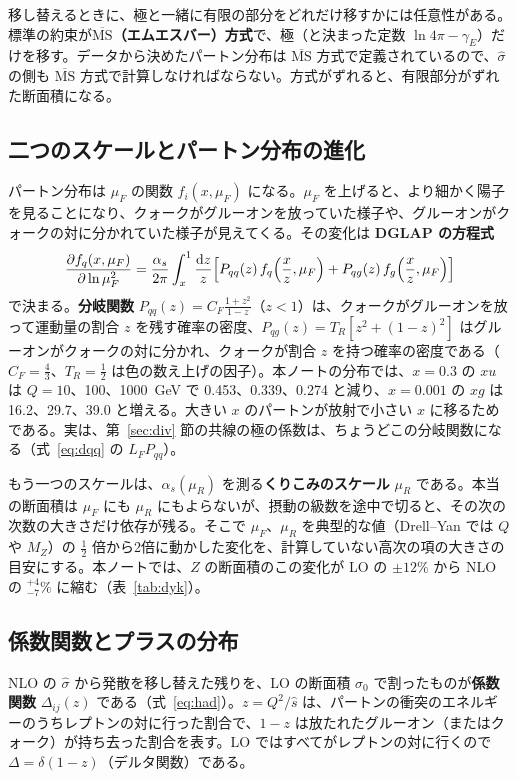 \documentclass[a4paper,10pt]{ltjsarticle}
\newcommand{\dd}{\mathrm{d}}
\newcommand{\MSbar}{\overline{\mathrm{MS}}}
\begin{document}
移し替えるときに、極と一緒に有限の部分をどれだけ移すかには任意性がある。標準の約束が\textbf{$\MSbar$（エムエスバー）方式}で、極（と決まった定数 $\ln4\pi-\gamma_E$）だけを移す。データから決めたパートン分布は $\MSbar$ 方式で定義されているので、$\hat\sigma$ の側も $\MSbar$ 方式で計算しなければならない。方式がずれると、有限部分がずれた断面積になる。

\subsection{二つのスケールとパートン分布の進化}\label{sec:scales}

パートン分布は $\mu_F$ の関数 $f_i(x,\mu_F)$ になる。$\mu_F$ を上げると、より細かく陽子を見ることになり、クォークがグルーオンを放っていた様子や、グルーオンがクォークの対に分かれていた様子が見えてくる。その変化は \textbf{DGLAP の方程式}
\[
\frac{\partial f_q(x,\mu_F)}{\partial\ln\mu_F^2}=\frac{\alpha_s}{2\pi}\int_x^1\frac{\dd z}z\Bigl[P_{qq}(z)\,f_q\Bigl(\frac xz,\mu_F\Bigr)+P_{qg}(z)\,f_g\Bigl(\frac xz,\mu_F\Bigr)\Bigr]
\]
で決まる。\textbf{分岐関数} $P_{qq}(z)=C_F\frac{1+z^2}{1-z}$（$z<1$）は、クォークがグルーオンを放って運動量の割合 $z$ を残す確率の密度、$P_{qg}(z)=T_R[z^2+(1-z)^2]$ はグルーオンがクォークの対に分かれ、クォークが割合 $z$ を持つ確率の密度である（$C_F=\frac43$、$T_R=\frac12$ は色の数え上げの因子）。本ノートの分布では、$x=0.3$ の $xu$ は $Q=10$、100、1000~GeV で 0.453、0.339、0.274 と減り、$x=0.001$ の $xg$ は 16.2、29.7、39.0 と増える。大きい $x$ のパートンが放射で小さい $x$ に移るためである。実は、第~\ref{sec:div} 節の共線の極の係数は、ちょうどこの分岐関数になる（式~\eqref{eq:dqq} の $L_FP_{qq}$）。

もう一つのスケールは、$\alpha_s(\mu_R)$ を測る\textbf{くりこみのスケール} $\mu_R$ である。本当の断面積は $\mu_F$ にも $\mu_R$ にもよらないが、摂動の級数を途中で切ると、その次の次数の大きさだけ依存が残る。そこで $\mu_F$、$\mu_R$ を典型的な値（Drell--Yan では $Q$ や $M_Z$）の $\frac12$ 倍から2倍に動かした変化を、計算していない高次の項の大きさの目安にする。本ノートでは、$Z$ の断面積のこの変化が LO の $\pm12\%$ から NLO の $^{+4}_{-7}\%$ に縮む（表~\ref{tab:dyk}）。

\subsection{係数関数とプラスの分布}\label{sec:coefintro}

NLO の $\hat\sigma$ から発散を移し替えた残りを、LO の断面積 $\sigma_0$ で割ったものが\textbf{係数関数} $\Delta_{ij}(z)$ である（式~\eqref{eq:had}）。$z=Q^2/\hat s$ は、パートンの衝突のエネルギーのうちレプトンの対に行った割合で、$1-z$ は放たれたグルーオン（またはクォーク）が持ち去った割合を表す。LO ではすべてがレプトンの対に行くので $\Delta=\delta(1-z)$（デルタ関数）である。
\end{document}
